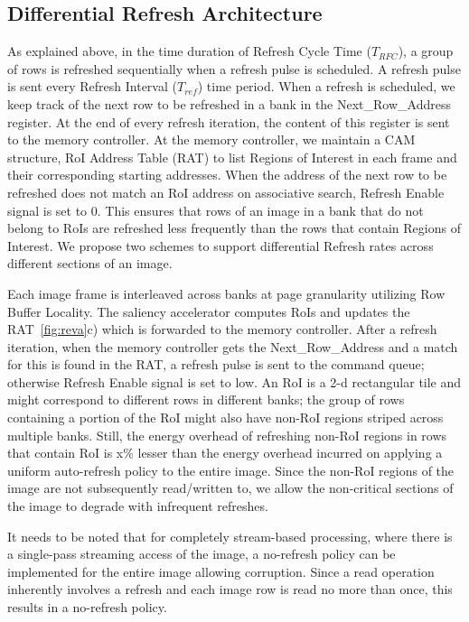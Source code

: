 \subsection{Differential Refresh Architecture}
As explained above, in the time duration of Refresh Cycle Time ($T_{RFC}$), a group of rows is refreshed sequentially when a refresh pulse is scheduled. A refresh pulse is sent every Refresh Interval ($T_{ref}$) time period.  When a refresh is scheduled, we keep track of the next row to be refreshed in a bank in the Next\_Row\_Address register. At the end of every refresh iteration, the content of this register is sent to the memory controller. At the memory controller, we maintain a CAM structure, RoI Address Table (RAT) to list Regions of Interest in each frame and their corresponding starting addresses. When the address of the next row to be refreshed does not match an RoI address on associative search, Refresh Enable signal is set to 0. This ensures that rows of an image in a bank that do not belong to RoIs are refreshed less frequently than the rows that contain Regions of Interest. We propose two schemes to support differential Refresh rates across different sections of an image. 

Each image frame is interleaved across banks at page granularity utilizing Row Buffer Locality. The saliency accelerator computes RoIs and updates the RAT~\ref{fig:reva}c) which is forwarded to the memory controller. After a refresh iteration, when the memory controller gets the Next\_Row\_Address and a match for this is found in the RAT, a refresh pulse is sent to the command queue; otherwise Refresh Enable signal is set to low. An RoI is a 2-d rectangular tile and might correspond to different rows in different banks; the group of rows containing a portion of the RoI might also have non-RoI regions striped across multiple banks. Still, the energy overhead of refreshing non-RoI regions in rows that contain RoI is x\% lesser than the energy overhead incurred on applying a uniform auto-refresh policy to the entire image. Since the non-RoI regions of the image are not subsequently read/written to, we allow the non-critical sections of the image to degrade with infrequent refreshes.  

It needs to be noted that for completely stream-based processing, where there is a single-pass streaming access of the image, a no-refresh policy can be implemented for the entire image allowing corruption. Since a read operation inherently involves a refresh and each image row is read no more than once, this results in a no-refresh policy. 


